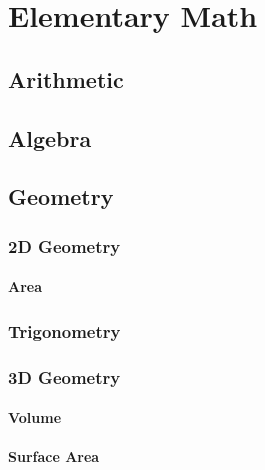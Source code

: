 \documentclass[../mathematics_cheat_sheet.tex]{subfiles}
\begin{document}
\part{Elementary Math}



\chapter{Arithmetic}


\chapter{Algebra}
\chapter{Geometry}
\section{2D Geometry}
\subsection{Area}
\section{Trigonometry}
\section{3D Geometry}
\subsection{Volume}
\subsection{Surface Area}
\end{document}
